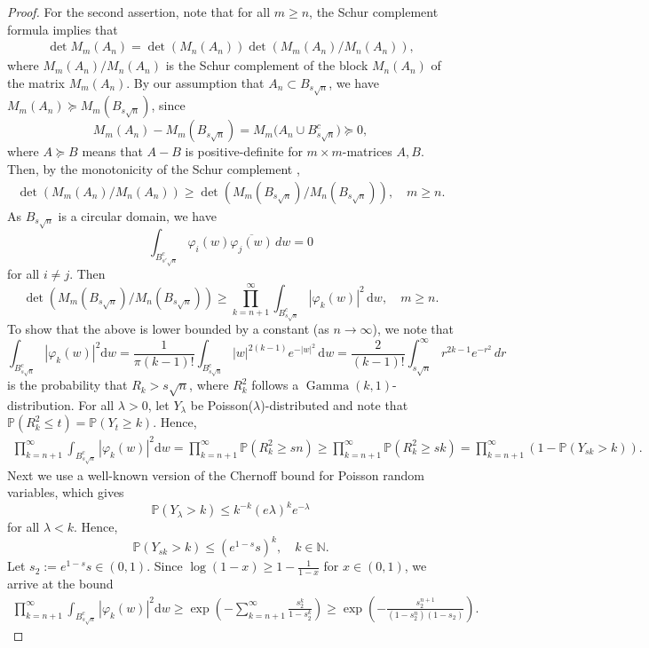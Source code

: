 \documentclass{amsart}
\theoremstyle{plain}
\theoremstyle{definition}
\theoremstyle{remark}
\def\P{\mathbb P}
\def\d{\mathrm d}
\begin{document}
\begin{proof}
	 For the second assertion, note that for all $m \ge n$, the Schur complement formula implies that
	\begin{align}\label{e:intstep}
		\det M_{m}(A_n)=\det (M_{n} (A_n)) \det( M_{m}(A_n)/M_{n} (A_n)),
	\end{align}
	where $M_{m}(A_n)/M_{n} (A_n)$ is the Schur complement of the block $M_{n} (A_n)$ of the matrix $M_{m}(A_n)$. 
By our assumption that $A_n \subset B_{s \sqrt n}$, we have $M_m(A_n) \succeq M_m( B_{s \sqrt n})$, since \[
M_m(A_n) - M_m( B_{s \sqrt n})  = M_m \big( A_n \cup  B_{s \sqrt n}^c  \big) \succeq  0,
\]
where $A \succeq B$ means that $A - B$ is positive-definite for $m \times m$-matrices $A,B$.
 Then, by the monotonicity of the Schur complement \cite[7.7.P41]{horn2012matrix}, 
	\begin{align*}
		\det( M_m(A_n)/M_n(A_n)) \ge  \det( M_m(B_{s\sqrt n})/M_n(B_{s\sqrt n})), \quad m \ge n.
	\end{align*}
As $B_{s \sqrt n}$ is a circular domain, we have
\[ \int_{B_{s' \sqrt n}^c} \varphi_i(w) \overline{\varphi_j(w)} \, dw =0
\]
for all $i \neq j$. Then
	$$
	\det( M_m(B_{s \sqrt n})/M_n(B_{s \sqrt n})) \ge \prod_{k=n+1}^\infty \int_{B_{s \sqrt n}^c} |\varphi_k(w)|^2\,  \d w, \quad m \ge n.
	$$
	To show that the above is lower bounded by a constant (as $n \to \infty$), we note that 
	\[
	\int_{B_{s \sqrt n}^c} |\varphi_k(w)|^2 \d w
	=  \frac{1}{ \pi (k-1)!} \int_{B_{s \sqrt n}^c} |w|^{2(k-1)} e^{-|w|^2} \, \d w 
	 =  \frac{2}{  (k-1)!}  \int_{s \sqrt{n}}^\infty r^{2k-1} e^{-r^2}\,dr
\] 
is the probability that $R_k >s \sqrt n$, where $R_k^2$ follows a $\operatorname{Gamma}(k,1)$-distribution. 
For all $\lambda>0$, let $Y_{\lambda}$ be Poisson($\lambda$)-distributed and note that $\P(R_k^2 \le  t)=\P(Y_{t}\ge  k) $. Hence,
	\begin{align*}
		\prod_{k=n+1}^\infty \int_{B_{s \sqrt n}^c} |\varphi_k(w)|^2 \d w = \prod_{k=n+1}^{\infty} \P(R_k^2 \ge s n) \ge \prod_{k=n+1}^{\infty} \P(R_k^2 \ge s k)=\prod_{k=n+1}^{\infty} (1-\P(Y_{s k} >k)).
	\end{align*}
	Next we use a well-known version of the Chernoff bound for Poisson random variables, which gives \[\mathbb P(Y_{\lambda}>k)\le k^{-k} (e\lambda)^k e^{-\lambda}\] for all $\lambda <k$. Hence,
	$$
	\P(Y_{s k} >k) \le (e^{1-s}s)^k, \quad k \in \mathbb N.
	$$
	Let $s_2:=e^{1-s }s \in (0,1)$. Since $\log (1-x) \ge 1-\frac{1}{1-x}$ for $x \in (0,1)$, we arrive at the bound
	\begin{align*}
		\prod_{k=n+1}^\infty \int_{B_{s \sqrt n}^c} |\varphi_k(w)|^2 \d w \ge \exp\left(-\sum_{k=n+1}^\infty \frac{s_2^k}{1-s_2^k}  \right) \ge \exp\left(- \frac{s_2^{n+1}}{(1-s_2^n)(1-s_2)}  \right).

\end{align*}
\end{proof}
\end{document}
